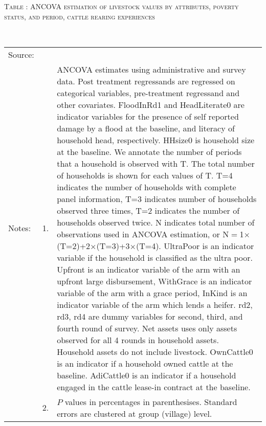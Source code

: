 \vspace{-1cm}\hspace{-1cm}\begin{minipage}[t]{14cm}
\hfil\textsc{\normalsize Table \thetable: ANCOVA estimation of livestock values by attributes, poverty status, and period, cattle rearing experiences\label{tab ANCOVA Livestock Experience timevarying poverty status attributes}}\\
\setlength{\tabcolsep}{1pt}
\setlength{\baselineskip}{8pt}
\renewcommand{\arraystretch}{.52}
\hfil{}\\
\renewcommand{\arraystretch}{.8}
\setlength{\tabcolsep}{1pt}
\begin{tabular}{>{\hfill\scriptsize}p{1cm}<{}>{\hfill\scriptsize}p{.25cm}<{}>{\scriptsize}p{12cm}<{\hfill}}
Source:& \multicolumn{2}{l}{\scriptsize Estimated with GUK administrative and survey data.}\\
Notes: & 1. & ANCOVA estimates using administrative and survey data. Post treatment regressands are regressed on categorical variables, pre-treatment regressand and other covariates. \textsf{FloodInRd1} and \textsf{HeadLiterate0} are indicator variables for the presence of self reported damage by a flood at the baseline, and literacy of household head, respectively. \textsf{HHsize0} is household size at the baseline. We annotate the number of periods that a household is observed with \textsf{T}. The total number of households is shown for each values of \textsf{T}. \textsf{T=4} indicates the number of households with complete panel information, \textsf{T=3} indicates number of households observed three times, \textsf{T=2} indicates the number of households observed twice. \textsf{N} indicates total number of observations used in ANCOVA estimation, or \textsf{N$=$1$\times$(T=2)+2$\times$(T=3)+3$\times$(T=4)}.  \textsf{UltraPoor} is an indicator variable if the household is classified as the ultra poor. \textsf{Upfront} is an indicator variable of the arm with an upfront large disbursement, \textsf{WithGrace} is an indicator variable of the arm with a grace period, \textsf{InKind} is an indicator variable of the arm which lends a heifer. \textsf{rd2, rd3, rd4} are dummy variables for second, third, and fourth round of survey.  Net assets uses only assets observed for all 4 rounds in household assets. Household assets do not include livestock. \textsf{OwnCattle0} is an indicator if a household owned cattle at the baseline. \textsf{AdiCattle0} is an indicator if a household engaged in the cattle lease-in contract at the baseline.  \\
& 2. & $P$ values in percentages in parenthesises. Standard errors are clustered at group (village) level.
\end{tabular}
\end{minipage}

